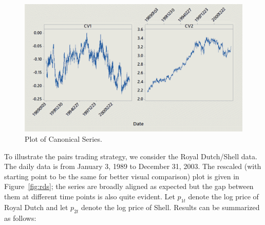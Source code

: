	\begin{figure}[!ht]
	\centering
	\includegraphics[width=\textwidth]{chapters/chapter_stat_ts/figures/can.png}
	\caption{Plot of Canonical Series. \label{fig:can}}
	\end{figure}


To illustrate the pairs trading strategy, we consider the Royal Dutch/Shell data. The daily data is from January 3, 1989 to December 31, 2003. The rescaled (with starting point to be the same for better visual comparison) plot is given in Figure~\ref{fig:rds}; the series are broadly aligned as expected but the gap between them at different time points is also quite evident. Let $p_{1t}$ denote the log price of Royal Dutch and let $p_{2t}$ denote the log price of Shell. Results can be summarized as follows:


